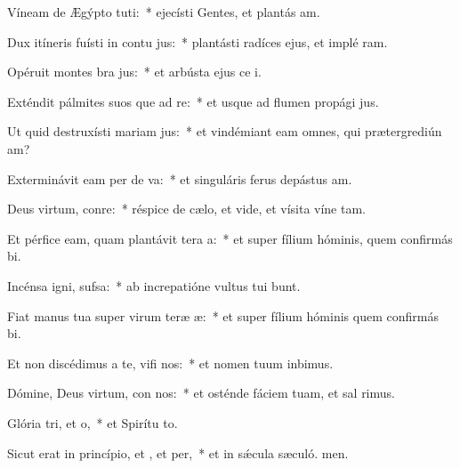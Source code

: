 \item Víneam de Ægýpto tuti:~* ejecísti Gentes, et plantás am.
\item Dux itíneris fuísti in contu jus:~* plantásti radíces ejus, et implé ram.
\item Opéruit montes bra jus:~* et arbústa ejus ce i.
\item Exténdit pálmites suos que ad re:~* et usque ad flumen propági jus.
\item Ut quid destruxísti mariam jus:~* et vindémiant eam omnes, qui prætergrediún am?
\item Exterminávit eam per de va:~* et singuláris ferus depástus  am.
\item Deus virtum, conre:~* réspice de cælo, et vide, et vísita víne tam.
\item Et pérfice eam, quam plantávit tera a:~* et super fílium hóminis, quem confirmás bi.
\item Incénsa igni,  sufsa:~* ab increpatióne vultus tui bunt.
\item Fiat manus tua super virum teræ æ:~* et super fílium hóminis quem confirmás bi.
\item Et non discédimus a te, vifi nos:~* et nomen tuum inbimus.
\item Dómine, Deus virtum, con nos:~* et osténde fáciem tuam, et sal rimus.
\item Glória tri, et o,~* et Spirítu to.
\item Sicut erat in princípio, et , et per,~* et in sǽcula sæculó. men.
